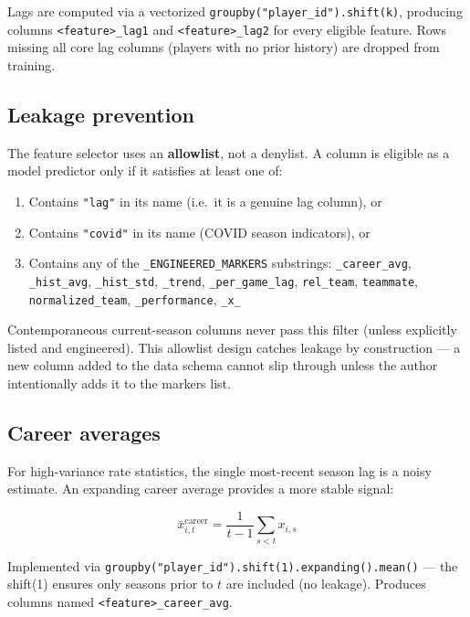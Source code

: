 \documentclass[11pt, a4paper]{article}
\begin{document}
Lags are computed via a vectorized \texttt{groupby("player\_id").shift(k)}, producing columns
\texttt{<feature>\_lag1} and \texttt{<feature>\_lag2} for every eligible feature.
Rows missing all core lag columns (players with no prior history) are dropped from training.

\subsection{Leakage prevention}

The feature selector uses an \textbf{allowlist}, not a denylist. A column is eligible as a
model predictor only if it satisfies at least one of:

\begin{enumerate}[leftmargin=*]
  \item Contains \texttt{"lag"} in its name (i.e.\ it is a genuine lag column), or
  \item Contains \texttt{"covid"} in its name (COVID season indicators), or
  \item Contains any of the \texttt{\_ENGINEERED\_MARKERS} substrings:
        \texttt{\_career\_avg}, \texttt{\_hist\_avg}, \texttt{\_hist\_std}, \texttt{\_trend},
        \texttt{\_per\_game\_lag}, \texttt{rel\_team}, \texttt{teammate},
        \texttt{normalized\_team}, \texttt{\_performance}, \texttt{\_x\_}
\end{enumerate}

Contemporaneous current-season columns never pass this filter (unless explicitly listed and
engineered). This allowlist design catches leakage by construction — a new column added to the
data schema cannot slip through unless the author intentionally adds it to the markers list.

\subsection{Career averages}

For high-variance rate statistics, the single most-recent season lag is a noisy estimate. An
expanding career average provides a more stable signal:

\begin{equation}
  \bar{x}_{i,t}^{\text{career}} = \frac{1}{t-1} \sum_{s < t} x_{i,s}
\end{equation}

Implemented via \texttt{groupby("player\_id").shift(1).expanding().mean()} — the shift(1)
ensures only seasons prior to $t$ are included (no leakage). Produces columns named
\texttt{<feature>\_career\_avg}.
\end{document}
